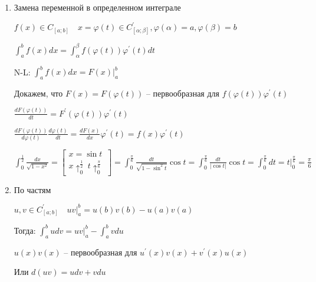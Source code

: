 \documentclass[12pt]{article}
\begin{document}
    \begin{enumerate}[label*=\arabic** ]
        \item \hypertarget{integralsubstitution}{Замена переменной в определенном интеграле}

        \begin{MyTheorem}
            \Ths $f(x) \in C_{[a;b]} \quad x = \varphi(t) \in C^\prime_{[\alpha;\beta]}, \varphi(\alpha) = a, \varphi(\beta) = b$

            $\int^b_a f(x)dx = \int^\beta_\alpha f(\varphi(t)) \varphi^\prime(t) dt$
        \end{MyTheorem}

        \begin{MyProof}
            N-L: $\int^b_a f(x)dx = F(x) \Big|_a^b$

            Докажем, что $F(x) = F(\varphi(t))$ -- первообразная для $f(\varphi(t))\varphi^\prime(t)$

            $\frac{dF(\varphi(t))}{dt} = F^\prime(\varphi(t)) \varphi^\prime(t)$

            $\frac{dF(\varphi(t))}{d\varphi(t)}\frac{d\varphi(t)}{dt} = \frac{dF(x)}{dx} \varphi^\prime(t) = f(x)\varphi^\prime(t)$
        \end{MyProof}

        \Ex $\int_0^{\frac{1}{2}} \frac{dx}{\sqrt{1 - x^2}} = 
        \begin{bmatrix}
            x = \sin t \\ x \uparrow^\frac{1}{2}_0 \ t \uparrow_0^\frac{\pi}{6}
        \end{bmatrix} =
        \int_0^\frac{\pi}{6} \frac{dt}{\sqrt{1 - \sin^2 t}}\cos t =
        \int_0^\frac{\pi}{6} \frac{dt}{|\cos t|} \cos t = \int_0^\frac{\pi}{6} dt = t \Big|_0^\frac{\pi}{6} = \frac{\pi}{6}$

        \item \hypertarget{integralbyparts}{По частям}

        \begin{MyTheorem}
            \Ths $u, v \in C^\prime_{[a;b]} \quad uv \Big|_a^b = u(b)v(b) - u(a)v(a)$

            Тогда: $\int^b_a udv = uv \Big|_a^b - \int^b_a vdu$
        \end{MyTheorem}

        \begin{MyProof}
            $u(x)v(x)$ -- первообразная для $u^\prime(x)v(x) + v^\prime(x)u(x)$

            Или $d(uv) = udv + vdu$


\end{MyProof}
\end{enumerate}
\end{document}
